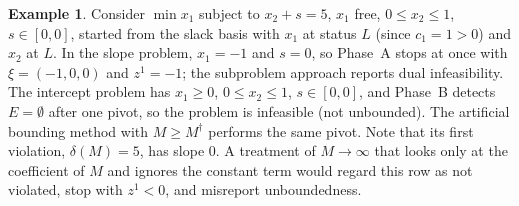 \documentclass[11pt,a4paper]{article}
\theoremstyle{plain}
\theoremstyle{definition}
\newtheorem{example}[theorem]{Example}
\theoremstyle{remark}
\begin{document}
\begin{example}
Consider $\min x_1$ subject to $x_2+s=5$, $x_1$ free, $0\le x_2\le1$, $s\in[0,0]$, started from the slack basis with $x_1$ at status $L$ (since $c_1=1>0$) and $x_2$ at $L$. In the slope problem, $x_1=-1$ and $s=0$, so Phase~A stops at once with $\xi=(-1,0,0)$ and $z^1=-1$; the subproblem approach reports dual infeasibility. The intercept problem has $x_1\ge0$, $0\le x_2\le1$, $s\in[0,0]$, and Phase~B detects $E=\emptyset$ after one pivot, so the problem is infeasible (not unbounded). The artificial bounding method with $M\ge M^\dagger$ performs the same pivot. Note that its first violation, $\delta(M)=5$, has slope $0$. A treatment of $M\to\infty$ that looks only at the coefficient of $M$ and ignores the constant term would regard this row as not violated, stop with $z^1<0$, and misreport unboundedness.
\end{example}
\end{document}
